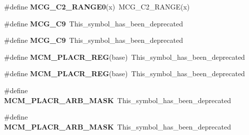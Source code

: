 \begin{DoxyCompactItemize}
\item 
\#define {\bfseries M\+C\+G\+\_\+\+C2\+\_\+\+R\+A\+N\+G\+E0}(x)~M\+C\+G\+\_\+\+C2\+\_\+\+R\+A\+N\+GE(x)\hypertarget{group__Backward__Compatibility__Symbols_ga4717ad2318b6cbc4586d554b59d0382e}{}\label{group__Backward__Compatibility__Symbols_ga4717ad2318b6cbc4586d554b59d0382e}

\item 
\#define {\bfseries M\+C\+G\+\_\+\+C9}~This\+\_\+symbol\+\_\+has\+\_\+been\+\_\+deprecated\hypertarget{group__Backward__Compatibility__Symbols_ga40ae99ab2fbda74612a8f3f6bab361e0}{}\label{group__Backward__Compatibility__Symbols_ga40ae99ab2fbda74612a8f3f6bab361e0}

\item 
\#define {\bfseries M\+C\+G\+\_\+\+C9}~This\+\_\+symbol\+\_\+has\+\_\+been\+\_\+deprecated\hypertarget{group__Backward__Compatibility__Symbols_ga40ae99ab2fbda74612a8f3f6bab361e0}{}\label{group__Backward__Compatibility__Symbols_ga40ae99ab2fbda74612a8f3f6bab361e0}

\item 
\#define {\bfseries M\+C\+M\+\_\+\+P\+L\+A\+C\+R\+\_\+\+R\+EG}(base)~This\+\_\+symbol\+\_\+has\+\_\+been\+\_\+deprecated\hypertarget{group__Backward__Compatibility__Symbols_ga7352403c798ebab30d2179fa9130011a}{}\label{group__Backward__Compatibility__Symbols_ga7352403c798ebab30d2179fa9130011a}

\item 
\#define {\bfseries M\+C\+M\+\_\+\+P\+L\+A\+C\+R\+\_\+\+R\+EG}(base)~This\+\_\+symbol\+\_\+has\+\_\+been\+\_\+deprecated\hypertarget{group__Backward__Compatibility__Symbols_ga7352403c798ebab30d2179fa9130011a}{}\label{group__Backward__Compatibility__Symbols_ga7352403c798ebab30d2179fa9130011a}

\item 
\#define {\bfseries M\+C\+M\+\_\+\+P\+L\+A\+C\+R\+\_\+\+A\+R\+B\+\_\+\+M\+A\+SK}~This\+\_\+symbol\+\_\+has\+\_\+been\+\_\+deprecated\hypertarget{group__Backward__Compatibility__Symbols_gaeea6e96c143304d5bb05ea7fc403efc3}{}\label{group__Backward__Compatibility__Symbols_gaeea6e96c143304d5bb05ea7fc403efc3}

\item 
\#define {\bfseries M\+C\+M\+\_\+\+P\+L\+A\+C\+R\+\_\+\+A\+R\+B\+\_\+\+M\+A\+SK}~This\+\_\+symbol\+\_\+has\+\_\+been\+\_\+deprecated\hypertarget{group__Backward__Compatibility__Symbols_gaeea6e96c143304d5bb05ea7fc403efc3}{}\label{group__Backward__Compatibility__Symbols_gaeea6e96c143304d5bb05ea7fc403efc3}


\end{DoxyCompactItemize}

